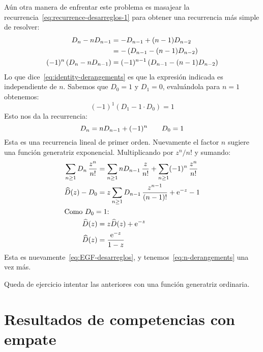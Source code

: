   Aún otra manera de enfrentar este problema
  es masajear la recurrencia~\eqref{eq:recurrence-desarreglos-1}
  para obtener una recurrencia más simple de resolver:%
  \begin{align}
    D_n - n D_{n - 1}
      &= - D_{n - 1} + (n - 1) D_{n - 2} \notag \\
      &= - \left( D_{n - 1} - (n - 1) D_{n - 2} \right) \notag \\
    (-1)^n \left( D_n - n D_{n - 1} \right)
      &= (-1)^{n - 1} \left( D_{n - 1} - (n - 1) D_{n - 2} \right)
	\label{eq:identity-derangements}
  \end{align}
  Lo que dice~\eqref{eq:identity-derangements}
  es que la expresión indicada es independiente de \(n\).
  Sabemos que \(D_0 = 1\) y \(D_1 = 0\),
  evaluándola para \(n = 1\) obtenemos:
  \begin{equation}
    \label{eq:identity-derangements-value}
    (-1)^1 \left( D_1 - 1 \cdot D_0 \right)
      = 1
  \end{equation}
  Esto nos da la recurrencia:
  \begin{equation}
    \label{eq:recurrence-derangements-3}
    \index{recurrencia!desarreglo}
    D_n
      = n D_{n - 1} + (-1)^n
    \qquad D_0 = 1
  \end{equation}
  Esta es una recurrencia lineal de primer orden.
  Nuevamente el factor \(n\)
  sugiere una función generatriz exponencial.%
  Multiplicando por \(z^n / n!\) y sumando:
  \begin{align*}
    \sum_{n \ge 1} D_n \, \frac{z^n}{n!}
      &= \sum_{n \ge 1} n D_{n - 1} \, \frac{z}{n!}
	   + \sum_{n \ge 1} (-1)^n \, \frac{z^n}{n!} \\
    \widehat{D}(z) - D_0
      &= z \sum_{n \ge 1} D_{n - 1} \, \frac{z^{n - 1}}{(n - 1)!}
	   + \mathrm{e}^{-z} - 1 \\
  \intertext{Como \(D_0 = 1\):}
    \widehat{D}(z)
      &= z \widehat{D}(z) + \mathrm{e}^{-z} \\
    \widehat{D}(z)
      &= \frac{\mathrm{e}^{-z}}{1 - z}
  \end{align*}
  Esta es nuevamente~\eqref{eq:EGF-desarreglos},
  y tenemos~\eqref{eq:n-derangements} una vez más.

  Queda de ejercicio intentar las anteriores
  con una función generatriz ordinaria.

\section{Resultados de competencias con empate}
\label{sec:campeonatos-empate}

